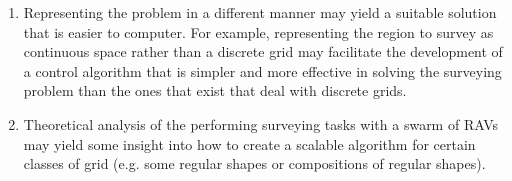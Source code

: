 \begin{enumerate}
    \item Representing the problem in a different manner may yield a suitable solution that is easier to computer. For example, representing the region to survey as continuous space rather than a discrete grid may facilitate the development of a control algorithm that is simpler and more effective in solving the surveying problem than the ones that exist that deal with discrete grids.
    \item Theoretical analysis of the performing surveying tasks with a swarm of RAVs may yield some insight into how to create a scalable algorithm for certain classes of grid (e.g. some regular shapes or compositions of regular shapes).

\end{enumerate}
